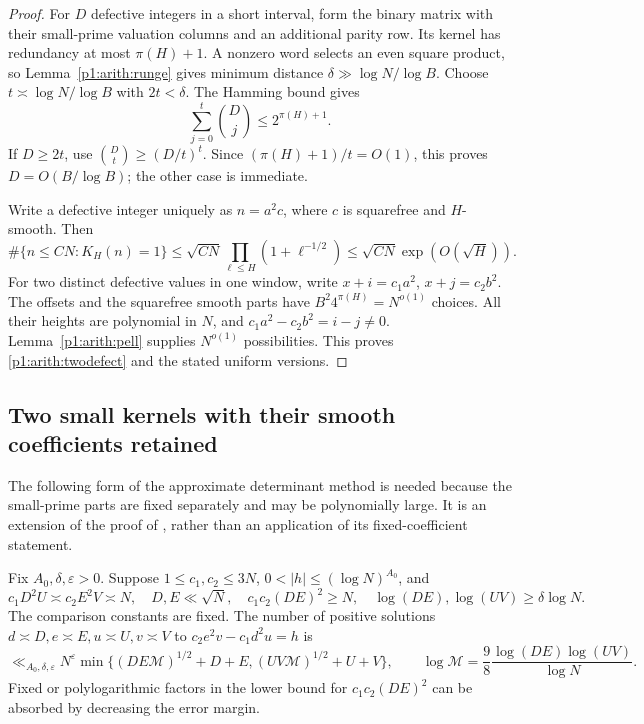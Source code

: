\begin{proof}
For $D$ defective integers in a short interval, form the binary matrix with
their small-prime valuation columns and an additional parity row.  Its
kernel has redundancy at most $\pi(H)+1$.  A nonzero word selects an even
square product, so Lemma~\ref{p1:arith:runge} gives minimum distance
$\delta\gg\log N/\log B$.  Choose
$t\asymp\log N/\log B$ with $2t<\delta$.  The Hamming bound gives
\[
 \sum_{j=0}^t\binom Dj\leq2^{\pi(H)+1}.
\]
If $D\geq2t$, use $\binom Dt\geq(D/t)^t$.  Since
$(\pi(H)+1)/t=O(1)$, this proves $D=O(B/\log B)$; the other case is
immediate.

Write a defective integer uniquely as $n=a^2c$, where $c$ is squarefree
and $H$-smooth.  Then
\[
 \#\{n\leq CN:K_H(n)=1\}
 \leq\sqrt{CN}\prod_{\ell\leq H}(1+\ell^{-1/2})
 \leq\sqrt{CN}\exp(O(\sqrt H)).
\]
For two distinct defective values in one window, write
$x+i=c_1a^2$, $x+j=c_2b^2$.  The offsets and the squarefree smooth parts
have $B^2 4^{\pi(H)}=N^{o(1)}$ choices.  All their heights are polynomial
in $N$, and $c_1a^2-c_2b^2=i-j\ne0$.
Lemma~\ref{p1:arith:pell} supplies $N^{o(1)}$ possibilities.  This proves
\eqref{p1:arith:twodefect} and the stated uniform versions.
\end{proof}

\subsection{Two small kernels with their smooth coefficients retained}

The following form of the approximate determinant method is needed because
the small-prime parts are fixed separately and may be polynomially large.
It is an extension of the proof of \cite[Sections~2.1--2.3]{reuss2014},
rather than an application of its fixed-coefficient statement.

\begin{lemma}\label{p1:arith:reuss}
Fix $A_0,\delta,\varepsilon>0$.  Suppose $1\leq c_1,c_2\leq3N$,
$0<|h|\leq(\log N)^{A_0}$, and
\[
 c_1D^2U\asymp c_2E^2V\asymp N,\quad
 D,E\ll\sqrt N,\quad c_1c_2(DE)^2\geq N,
 \quad\log(DE),\log(UV)\geq\delta\log N.
\]
The comparison constants are fixed.  The number of positive solutions
$d\asymp D,e\asymp E,u\asymp U,v\asymp V$ to
$c_2e^2v-c_1d^2u=h$ is
\begin{equation}\label{p1:arith:reussbound}
 \ll_{A_0,\delta,\varepsilon}N^\varepsilon
 \min\{(DE\mathcal M)^{1/2}+D+E,
          (UV\mathcal M)^{1/2}+U+V\},
 \qquad
 \log\mathcal M=\frac98\frac{\log(DE)\log(UV)}{\log N}.
\end{equation}
Fixed or polylogarithmic factors in the lower bound for $c_1c_2(DE)^2$
can be absorbed by decreasing the error margin.
\end{lemma}

